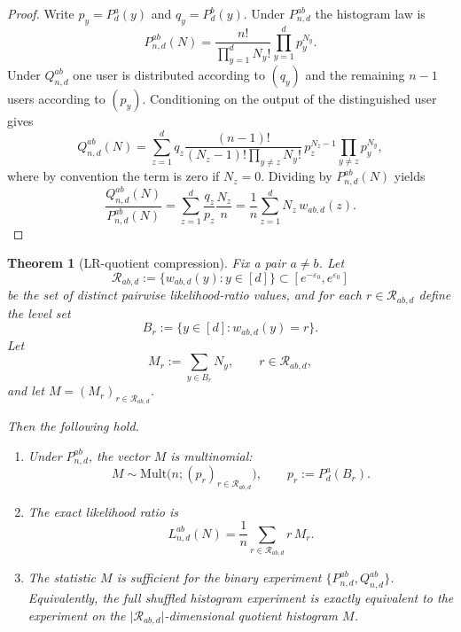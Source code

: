 \documentclass[11pt]{amsart}
\numberwithin{equation}{section}
\newtheorem{theorem}{Theorem}[section]
\theoremstyle{definition}
\newcommand{\Mult}{\mathrm{Mult}}
\begin{document}
\begin{proof}
Write $p_y=P_d^a(y)$ and $q_y=P_d^b(y)$.
Under $P_{n,d}^{ab}$ the histogram law is
\[
P_{n,d}^{ab}(N)
=
\frac{n!}{\prod_{y=1}^d N_y!}\prod_{y=1}^d p_y^{N_y}.
\]
Under $Q_{n,d}^{ab}$ one user is distributed according to $(q_y)$ and the remaining $n-1$ users according
to $(p_y)$.  Conditioning on the output of the distinguished user gives
\[
Q_{n,d}^{ab}(N)
=
\sum_{z=1}^d q_z
\frac{(n-1)!}{(N_z-1)!\prod_{y\neq z}N_y!}
\,p_z^{N_z-1}\prod_{y\neq z}p_y^{N_y},
\]
where by convention the term is zero if $N_z=0$.
Dividing by $P_{n,d}^{ab}(N)$ yields
\[
\frac{Q_{n,d}^{ab}(N)}{P_{n,d}^{ab}(N)}
=
\sum_{z=1}^d \frac{q_z}{p_z}\frac{N_z}{n}
=
\frac1n\sum_{z=1}^d N_z\,w_{ab,d}(z).
\]
\end{proof}

\begin{theorem}[LR-quotient compression]\label{thm:compression}
Fix a pair $a\neq b$.
Let
\[
\mathcal R_{ab,d}:=\{w_{ab,d}(y):y\in[d]\}
\subset [e^{-\varepsilon_0},e^{\varepsilon_0}]
\]
be the set of distinct pairwise likelihood-ratio values, and for each $r\in\mathcal R_{ab,d}$ define the
level set
\[
B_r:=\{y\in[d]: w_{ab,d}(y)=r\}.
\]
Let
\[
M_r:=\sum_{y\in B_r}N_y,
\qquad
r\in\mathcal R_{ab,d},
\]
and let $M=(M_r)_{r\in\mathcal R_{ab,d}}$.

Then the following hold.
\begin{enumerate}
\item Under $P_{n,d}^{ab}$, the vector $M$ is multinomial:
\[
M \sim \Mult\!\bigl(n;(p_r)_{r\in\mathcal R_{ab,d}}\bigr),
\qquad
p_r:=P_d^a(B_r).
\]
\item The exact likelihood ratio is
\[
L_{n,d}^{ab}(N)=\frac1n\sum_{r\in\mathcal R_{ab,d}} r\,M_r. \tag{3.2}\label{eq:compressed-lr}
\]
\item The statistic $M$ is sufficient for the binary experiment
\(
\{P_{n,d}^{ab},Q_{n,d}^{ab}\}
\).
Equivalently, the full shuffled histogram experiment is exactly equivalent to the experiment on the
$\lvert \mathcal R_{ab,d}\rvert$-dimensional quotient histogram $M$.
\end{enumerate}
\end{theorem}
\end{document}
